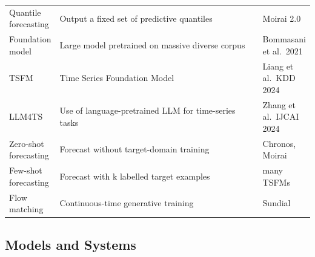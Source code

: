 \documentclass{article}
\begin{document}
\begin{table}[t]
\begin{tabular}{>{\raggedright\arraybackslash}p{0.1656\linewidth}
  >{\raggedright\arraybackslash}p{0.6752\linewidth}
  >{\raggedright\arraybackslash}p{0.1592\linewidth}}
Quantile forecasting & Output a fixed set of predictive quantiles & Moirai 2.0 \cite{liu2025calfaligningllmsfo} \\
Foundation model & Large model pretrained on massive diverse corpus & Bommasani et al.~2021 \\
TSFM & Time Series Foundation Model & Liang et al.~KDD 2024 \\
LLM4TS & Use of language-pretrained LLM for time-series tasks & Zhang et al.~IJCAI 2024 \\
Zero-shot forecasting & Forecast without target-domain training & Chronos, Moirai \\
Few-shot forecasting & Forecast with k labelled target examples & many TSFMs \\
Flow matching & Continuous-time generative training & Sundial \cite{liu2025calfaligningllmsfo} \\
\end{tabular}
\end{table}

\subsection{Models and Systems}\label{models-and-systems}
\end{document}
